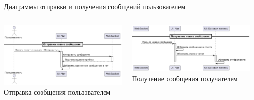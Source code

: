 \documentclass[aspectratio=169]{beamer}
\begin{document}
\begin{frame}{Диаграммы отправки и получения сообщений пользователем}
\vspace{0.5em}

\begin{columns}
    \begin{column}{0.5\textwidth}
        \centering
        \includegraphics[width=0.95\linewidth]{static/MessageSendDiagram.png} \\
        \small Отправка сообщения пользователем
    \end{column}
    \begin{column}{0.5\textwidth}
        \centering
        \includegraphics[width=0.95\linewidth]{static/MessageReceiveDiagram.png} \\
        \small Получение сообщения получателем
    \end{column}
\end{columns}
\end{frame}

%
\end{document}
